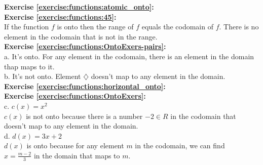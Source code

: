 
\noindent\textbf{Exercise \ref{exercise:functions:atomic_onto}:}\\

\noindent\textbf{Exercise \ref{exercise:functions:45}:}\\
If the function $f$ is onto then the range of $f$ equals the codomain of $f$. There is no element in the codomain that is not in the range.\\

\noindent\textbf{Exercise \ref{exercise:functions:OntoExers-pairs}:}\\
a. It's onto. For any element in the codomain, there is an element in the domain thap maps to it.\\
b. It's not onto. Element $\diamondsuit$ doesn't map to any element in the domain.\\


\noindent\textbf{Exercise \ref{exercise:functions:horizontal_onto}:}\\

\noindent\textbf{Exercise \ref{exercise:functions:OntoExers}:}\\
c. $c(x)=x^2$\\
$c(x)$ is not onto because there is a number $-2 \in R$ in the codomain that doesn't map to any element in the domain.\\
d. $d(x)=3x+2$\\
$d(x)$ is onto because for any element $m$ in the codomain, we can find\\ $x=\displaystyle\frac{m-2}{3}$ in the domain that maps to $m$.\\

